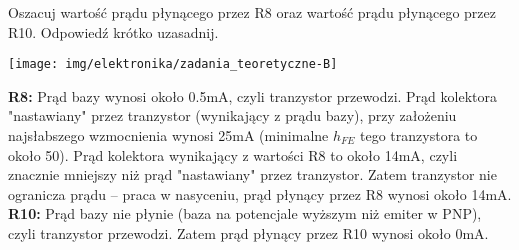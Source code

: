 % 
% 
% 
% 




%
%

\dbEntryCheckResults
Oszacuj wartość prądu płynącego przez R8 oraz wartość prądu płynącego przez R10. Odpowiedź krótko uzasadnij.
	\begin{center}
		\texttt{[image: img/elektronika/zadania\_teoretyczne-B]}
	\end{center}
\fi
{}\dbEntryCheckResults
\textbf{R8:} Prąd bazy wynosi około 0.5mA, czyli tranzystor przewodzi.
             Prąd kolektora "nastawiany" przez tranzystor (wynikający z prądu bazy), przy założeniu najsłabszego wzmocnienia wynosi 25mA (minimalne $h_{FE}$ tego tranzystora to około 50).
             Prąd kolektora wynikający z wartości R8 to około 14mA, czyli znacznie mniejszy niż prąd "nastawiany" przez tranzystor.
             Zatem tranzystor nie ogranicza prądu – praca w nasyceniu, prąd płynący przez R8 wynosi około 14mA.\\
\textbf{R10:} Prąd bazy nie płynie (baza na potencjale wyższym niż emiter w PNP), czyli tranzystor przewodzi.
              Zatem prąd płynący przez R10 wynosi około 0mA.
\fi

